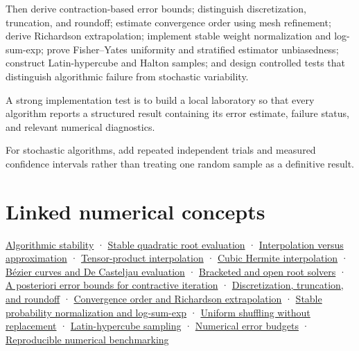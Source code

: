Then derive contraction-based error bounds; distinguish discretization, truncation, and roundoff; estimate convergence order using mesh refinement; derive Richardson extrapolation; implement stable weight normalization and log-sum-exp; prove Fisher--Yates uniformity and stratified estimator unbiasedness; construct Latin-hypercube and Halton samples; and design controlled tests that distinguish algorithmic failure from stochastic variability.

A strong implementation test is to build a local laboratory so that every algorithm reports a structured result containing its error estimate, failure status, and relevant numerical diagnostics.

For stochastic algorithms, add repeated independent trials and measured confidence intervals rather than treating one random sample as a definitive result.

\section{Linked numerical concepts}\label{02-foundations-ii-ch039-linked-numerical-concepts}

\hyperref[02-foundations-ii-ch028-floating-point-answers-error-conditioning-stability-and-stable-arithmetic]{Algorithmic stability} · \hyperref[02-foundations-ii-ch028-floating-point-answers-error-conditioning-stability-and-stable-arithmetic]{Stable quadratic root evaluation} · \hyperref[02-foundations-ii-ch028-reconstructing-values-and-curves-between-samples]{Interpolation versus approximation} · \hyperref[02-foundations-ii-ch028-reconstructing-values-and-curves-between-samples]{Tensor-product interpolation} · \hyperref[02-foundations-ii-ch028-reconstructing-values-and-curves-between-samples]{Cubic Hermite interpolation} · \hyperref[02-foundations-ii-ch028-reconstructing-values-and-curves-between-samples]{Bézier curves and De Casteljau evaluation} · \hyperref[02-foundations-ii-ch028-finding-roots-with-guarantees-and-convergence-checks]{Bracketed and open root solvers} · \hyperref[02-foundations-ii-ch028-finding-roots-with-guarantees-and-convergence-checks]{A posteriori error bounds for contractive iteration} · \hyperref[02-foundations-ii-ch029-separate-discretization-truncation-and-roundoff-measure-convergence]{Discretization, truncation, and roundoff} · \hyperref[02-foundations-ii-ch029-separate-discretization-truncation-and-roundoff-measure-convergence]{Convergence order and Richardson extrapolation} · \hyperref[02-foundations-ii-ch031-keep-probability-weights-stable-before-sampling]{Stable probability normalization and log-sum-exp} · \hyperref[02-foundations-ii-ch031-design-samples-without-replacement-stratified-and-low-discrepancy]{Uniform shuffling without replacement} · \hyperref[02-foundations-ii-ch031-design-samples-without-replacement-stratified-and-low-discrepancy]{Latin-hypercube sampling} · \hyperref[02-foundations-ii-ch029-separate-discretization-truncation-and-roundoff-measure-convergence]{Numerical error budgets} · \hyperref[02-foundations-ii-ch031-test-numerical-methods-and-benchmark-reproducibly]{Reproducible numerical benchmarking}

